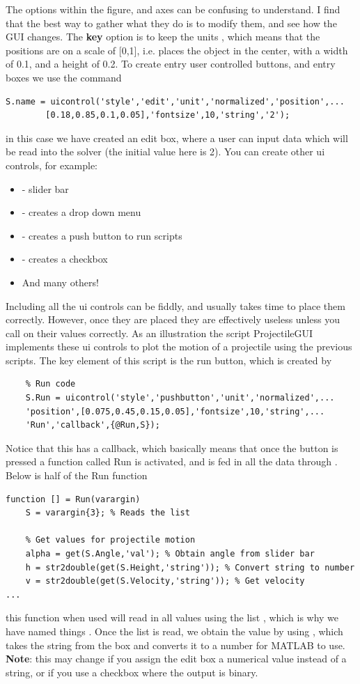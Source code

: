 \documentclass[12pt]{report}
\begin{document}
\noindent The options within the figure, and axes can be confusing to understand. I find that the best way to gather what they do is to modify them, and see how the GUI changes. The \textbf{key} option is to keep the units , which means that the positions are on a scale of [0,1], i.e. \mcode{[0.5,0.5,0.1,0.2]} places the object in the center, with a width of 0.1, and a height of 0.2. To create entry user controlled buttons, and entry boxes we use the command
\begin{lstlisting}
S.name = uicontrol('style','edit','unit','normalized','position',...
        [0.18,0.85,0.1,0.05],'fontsize',10,'string','2');
\end{lstlisting}
in this case we have created an edit box, where a user can input data which will be read into the solver (the initial value here is 2). You can create other ui controls, for example:
\begin{itemize}
\item {} - slider bar
\item {} - creates a drop down menu
\item {} - creates a push button to run scripts
\item {} - creates a checkbox
\item And many others!
\end{itemize}
Including all the ui controls can be fiddly, and usually takes time to place them correctly. However, once they are placed they are effectively useless unless you call on their values correctly. As an illustration the script ProjectileGUI implements these ui controls to plot the motion of a projectile using the previous scripts. The key element of this script is the run button, which is created by
\begin{lstlisting}
    % Run code
    S.Run = uicontrol('style','pushbutton','unit','normalized',...
    'position',[0.075,0.45,0.15,0.05],'fontsize',10,'string',...
    'Run','callback',{@Run,S});
\end{lstlisting}
Notice that this has a callback, which basically means that once the button is pressed a function called Run is activated, and is fed in all the data through . Below is half of the Run function
\begin{lstlisting}
function [] = Run(varargin)
    S = varargin{3}; % Reads the list
    
    % Get values for projectile motion
    alpha = get(S.Angle,'val'); % Obtain angle from slider bar
    h = str2double(get(S.Height,'string')); % Convert string to number
    v = str2double(get(S.Velocity,'string')); % Get velocity
...
\end{lstlisting}
this function when used will read in all values using the list , which is why we have named things . Once the list is read, we obtain the value by using , which takes the string from the box and converts it to a number for MATLAB to use. \textbf{Note}: this may change if you assign the edit box a numerical value instead of a string, or if you use a checkbox where the output is binary.\\
\end{document}
